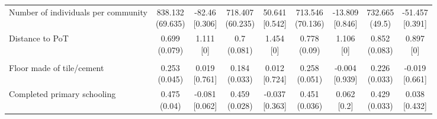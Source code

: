 {\begin{tabular}[t]{lcccccccc}
\hspace{1em}Number of individuals per community & \makecell[c]{838.132\\(69.635)} & \makecell[c]{-82.46\\{[0.306]}} & \makecell[c]{718.407\\(60.235)} & \makecell[c]{50.641\\{[0.542]}} & \makecell[c]{713.546\\(70.136)} & \makecell[c]{-13.809\\{[0.846]}} & \makecell[c]{732.665\\(49.5)} & \makecell[c]{-51.457\\{[0.391]}}\\
\hspace{1em}Distance to PoT & \makecell[c]{0.699\\(0.079)} & \makecell[c]{1.111\\{[0]}} & \makecell[c]{0.7\\(0.081)} & \makecell[c]{1.454\\{[0]}} & \makecell[c]{0.778\\(0.09)} & \makecell[c]{1.106\\{[0]}} & \makecell[c]{0.852\\(0.083)} & \makecell[c]{0.897\\{[0]}}\\
\addlinespace[0.3em]
\hline
\multicolumn{9}{l}{\textit{\textbf{Panel B: Baseline demographics, $N=1,995$}}}\\
\hline
\hspace{1em}Floor made of tile/cement & \makecell[c]{0.253\\(0.045)} & \makecell[c]{0.019\\{[0.761]}} & \makecell[c]{0.184\\(0.033)} & \makecell[c]{0.012\\{[0.724]}} & \makecell[c]{0.258\\(0.051)} & \makecell[c]{-0.004\\{[0.939]}} & \makecell[c]{0.226\\(0.033)} & \makecell[c]{-0.019\\{[0.661]}}\\
\hspace{1em}Completed primary schooling & \makecell[c]{0.475\\(0.04)} & \makecell[c]{-0.081\\{[0.062]}} & \makecell[c]{0.459\\(0.028)} & \makecell[c]{-0.037\\{[0.363]}} & \makecell[c]{0.451\\(0.036)} & \makecell[c]{0.062\\{[0.2]}} & \makecell[c]{0.429\\(0.033)} & \makecell[c]{0.038\\{[0.432]}}\\

\end{tabular}}

